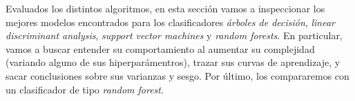 



Evaluados los distintos algoritmos, en esta sección vamos a inspeccionar los mejores modelos encontrados para los clasificadores \textit{árboles de decisión}, \textit{linear discriminant analysis}, \textit{support vector machines} y \textit{random forests}. En particular, vamos a buscar entender su comportamiento al aumentar su complejidad (variando alguno de sus hiperparámentros), trazar sus curvas de aprendizaje, y sacar conclusiones sobre sus varianzas y sesgo. Por último, los compararemos con un clasificador de tipo \textit{random forest}.

